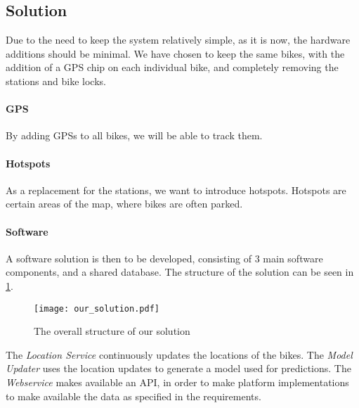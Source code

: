 \subsection{Solution}
Due to the need to keep the system relatively simple, as it is now, the hardware additions should be minimal.
We have chosen to keep the same bikes, with the addition of a GPS chip on each individual bike, and completely removing the stations and bike locks.

\paragraph{GPS}
\newcommand{\prob}[1]{\textbf{\##1}}
By adding GPSs to all bikes, we will be able to track them.

\paragraph{Hotspots}
As a replacement for the stations, we want to introduce hotspots.
Hotspots are certain areas of the map, where bikes are often parked.

\paragraph{Software}
A software solution is then to be developed, consisting of 3 main software components, and a shared database.
The structure of the solution can be seen in \cref{fig:solution_structure}.

\begin{figure}[h]
\texttt{[image: our\_solution.pdf]}
\caption{The overall structure of our solution}
\label{fig:solution_structure}
\end{figure}

The \textit{Location Service} continuously updates the locations of the bikes.
The \textit{Model Updater} uses the location updates to generate a model used for predictions.
The \textit{Webservice} makes available an API, in order to make platform implementations to make available the data as specified in the requirements.
